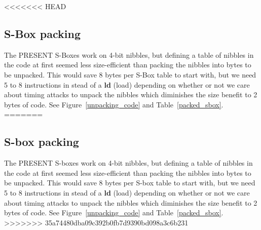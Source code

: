 \documentclass[11pt]{article}
\begin{document}
<<<<<<< HEAD
\subsection{S-Box packing}\label{sbox_packing}
The PRESENT S-Boxes work on 4-bit nibbles, but defining a table of nibbles in the code at first seemed less size-efficient than packing the nibbles into bytes to be unpacked.
This would save 8 bytes per S-Box table to start with, but we need 5 to 8 instructions in stead of a \textbf{ld} (load) depending on whether or not we care about timing attacks to unpack the nibbles which diminishes the size benefit to 2 bytes of code. See Figure~\ref{unpacking_code} and Table~\ref{packed_sbox}.
=======
\subsection{S-box packing}\label{sbox_packing}
The PRESENT S-boxes work on 4-bit nibbles, but defining a table of nibbles in the code at first seemed less size-efficient than packing the nibbles into bytes to be unpacked.
This would save 8 bytes per S-box table to start with, but we need 5 to 8 instructions in stead of a \textbf{ld} (load) depending on whether or not we care about timing attacks to unpack the nibbles which diminishes the size benefit to 2 bytes of code. See Figure~\ref{unpacking_code} and Table~\ref{packed_sbox}.
>>>>>>> 35a74480dba09c392b0fb7d9390bd098a3c6b231
\end{document}

